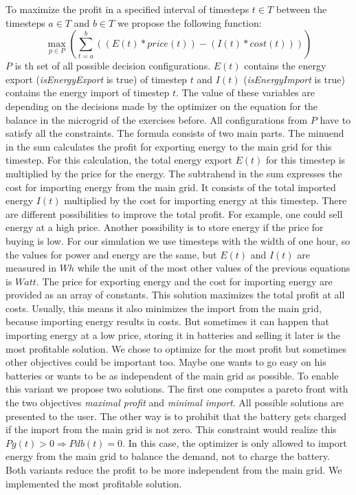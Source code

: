 To maximize the profit in a specified interval of timesteps $t \in T$ between the timesteps $a \in T$ and $b \in T$ we propose the following function:
\begin{equation} \label{eq:opt}
\max_{p \in P}{(\sum_{t=a}^{b}{((E(t)*price(t))-(I(t)*cost(t)))})}
\end{equation}
$P$ is th set of all possible decision configurations.
$E(t)$ contains the energy export (\textit{isEnergyExport} is true) of timestep $t$ and $I(t)$ (\textit{isEnergyImport} is true) contains the energy import of timestep $t$.
The value of these variables are depending on the decisions made by the optimizer on the equation for the balance in the microgrid of the exercises before. 
All configurations from $P$ have to satisfy all the constraints. 
The formula consists of two main parts. 
The minuend in the sum calculates the profit for exporting energy to the main grid for this timestep. 
For this calculation, the total energy export $E(t)$ for this timestep is multiplied by the price for the energy. 
The subtrahend in the sum expresses the cost for importing energy from the main grid. 
It consists of the total imported energy $I(t)$ multiplied by the cost for importing energy at this timestep. 
There are different possibilities to improve the total profit. 
For example, one could sell energy at a high price. 
Another possibility is to store energy if the price for buying is low. 
For our simulation we use timesteps with the width of one hour, so the values for power and energy are the same, but $E(t)$ and $I(t)$ are measured in $Wh$ while the unit of the most other values of the previous equations is $Watt$. The price for exporting energy and the cost for importing energy are provided as an array of constants.
This solution maximizes the total profit at all costs. Usually, this means it also minimizes the import from the main grid, because importing energy results in costs. But sometimes it can happen that importing energy at a low price, storing it in batteries and selling it later is the most profitable solution. We chose to optimize for the most profit but sometimes other objectives could be important too. Maybe one wants to go easy on his batteries or wants to be as independent of the main grid as possible. To enable this variant we propose two solutions. The first one computes a pareto front with the two objectives \textit{maximal profit} and \textit{minimal import}. All possible solutions are presented to the user.
The other way is to prohibit that the battery gets charged if the import from the main grid is not zero. This constraint would realize this $Pg(t) > 0 \Rightarrow Pdb(t) = 0$.
In this case, the optimizer is only allowed to import energy from the main grid to balance the demand, not to charge the battery.
Both variants reduce the profit to be more independent from the main grid. We implemented the most profitable solution.


